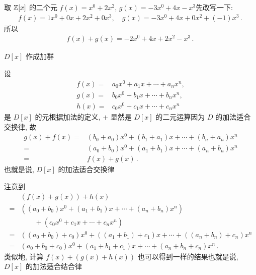 \begin{example}
    取 $\mathbb{Z}[x]$ 的二个元 $f(x)=x^0 + 2x^2$, $g(x)=-3x^0 + 4x - x^3$\period 先改写一下:
    \begin{align*}
        f(x) = 1x^0 + 0x + 2x^2 + 0x^3, \quad g(x) = -3x^0 + 4x + 0x^2 + (-1)x^3 \period
    \end{align*}
    所以
    \begin{align*}
        f(x) + g(x) = -2x^0 + 4x + 2x^2 - x^3 \period
    \end{align*}
\end{example}

\begin{proposition}
    $D[x]$ 作成加群\period
\end{proposition}

\begin{pf}
    设
    \begin{align*}
        f(x) = {} & a_0 x^0 + a_1 x + \cdots + a_n x^n, \\
        g(x) = {} & b_0 x^0 + b_1 x + \cdots + b_n x^n, \\
        h(x) = {} & c_0 x^0 + c_1 x + \cdots + c_n x^n
    \end{align*}
    是 $D[x]$ 的元\period 根据加法的定义, $+$ 显然是 $D[x]$ 的二元运算\period 因为 $D$ 的加法适合交换律, 故
    \begin{align*}
        g(x) + f(x)
        = {} & (b_0 + a_0) x^0 + (b_1 + a_1) x + \cdots + (b_n + a_n) x^n \\
        = {} & (a_0 + b_0) x^0 + (a_1 + b_1) x + \cdots + (a_n + b_n) x^n \\
        = {} & f(x) + g(x) \period
    \end{align*}
    也就是说, $D[x]$ 的加法适合交换律\period

    注意到
    \begin{align*}
             & (f(x) + g(x)) + h(x)                                                                 \\
        = {} & ((a_0 + b_0) x^0 + (a_1 + b_1) x + \cdots + (a_n + b_n) x^n)                         \\
             & \qquad + (c_0 x^0 + c_1 x + \cdots + c_n x^n)                                        \\
        = {} & ((a_0 + b_0) + c_0) x^0 + ((a_1 + b_1) + c_1) x + \cdots + ((a_n + b_n) + c_n) x^n   \\
        = {} & (a_0 + b_0 + c_0) x^0 + (a_1 + b_1 + c_1) x + \cdots + (a_n + b_n + c_n) x^n \period
    \end{align*}
    类似地, 计算 $f(x) + (g(x) + h(x))$ 也可以得到一样的结果\period 也就是说, $D[x]$ 的加法适合结合律\period


\end{pf}
